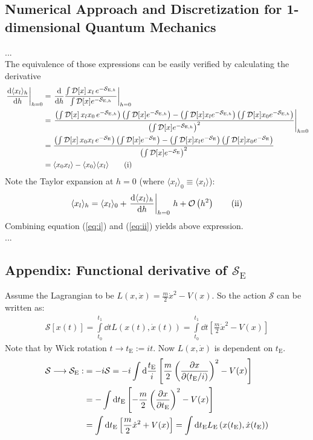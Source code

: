 \documentclass[11pt,a4paper]{scrartcl}
\newcommand{\action}{\ensuremath{\mathcal{S}}}
\newcommand{\avg}[1]{\langle#1\rangle}
\newcommand{\SE}{\mathcal{S}_{\mathrm{E}}}
\newcommand{\SEh}{\mathcal{S}_{\mathrm{E},h}}
\newcommand{\pathinth}[1]{\int\mathcal{D}[x]#1e^{-\SEh}}
\newcommand{\pathint}[1]{\int\mathcal{D}[x]#1e^{-\SE}}
\newcommand{\BigO}[1]{\mathcal{O}\left(#1\right)}
\newcommand{\tE}{\ensuremath{t_{\mathrm{E}}}}
\begin{document}
\subsection{Numerical Approach and Discretization
for 1-dimensional Quantum Mechanics}
...\\
The equivalence of those expressions can be easily verified by calculating the derivative\\
\begin{align*}
    \eval{\dv{\avg{x_l}_h}{h}}_{h=0} &=
    \eval{\dv{h}\frac{\pathinth{\,x_l\,}}{\pathinth{}}}_{h=0} \\ &=
    \eval{\frac{\left(\pathinth{\,x_l x_0\,}\right)\left(\pathinth{}\right)
    -\left(\pathinth{x_l}\right)\left(\pathinth{x_0}\right)}
    {\left(\pathinth{}\right)^2}}_{h=0} \\ &=
    \frac{\left(\pathint{\,x_0 x_l\,}\right)\left(\pathint{}\right)
    -\left(\pathint{x_l}\right)\left(\pathint{x_0}\right)}
    {\left(\pathint{}\right)^2} \\ &=
    \avg{x_0 x_l}-\avg{x_0}\avg{x_l} \tag{i}\label{eq:i}
\end{align*}
Note the Taylor expansion at $h=0$ (where $\avg{x_l}_0\equiv\avg{x_l}$):
\begin{equation*}
    \avg{x_l}_h=\avg{x_l}_0+\eval{\dv{\avg{x_l}_h}{h}}_{h=0}\,h+\BigO{h^2}
    \tag{ii}\label{eq:ii}
\end{equation*}
Combining equation (\ref{eq:i}) and (\ref{eq:ii}) yields above expression.\\
...\\

\newpage
\subsection{Appendix: Functional derivative of $\SE$\label{app:derivSE}}

Assume the Lagrangian to be $L(x,\dot{x})=\frac{m}{2} \dot{x}^2-V(x)$. So the action $\action$ can be written as:
\begin{align}
    \action\left[x(t)\right] = \int\limits_{t_0}^{t_1}\dd{t}L\left(x(t), \dot{x}(t)\right) = \int\limits_{t_0}^{t_1}\dd{t}\left[\frac{m}{2}\dot{x}^2-V(x)\right]\label{eq:S}
\end{align}
\noindent Note that by Wick rotation $t\longrightarrow \tE:=it$. Now $L(x,\dot{x})$ is dependent on $\tE$.
\begin{align}
    \action\longrightarrow\SE:&=-i\action
    =-i\int\dd\frac{\tE}{i}\left[\frac{m}{2}\left(\pdv{x}{(\tE/i)}\right)^2-V(x)\right] \\
    &=-\int\dd\tE\left[-\frac{m}{2}\left(\pdv{x}{\tE}\right)^2-V(x)\right] \\
    &=\int\dd\tE\left[\frac{m}{2}\dot{x}^2+V(x)\right] =  \int\dd\tE L_\mathrm{E}\left(x(t_\mathrm{E}), \dot{x}(t_\mathrm{E})\right)\label{eq:SE}
\end{align}
\end{document}
